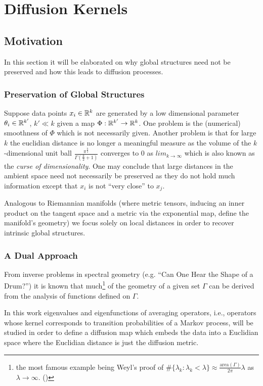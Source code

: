 \section{Diffusion Kernels}
\subsection{Motivation}
In this section it will be elaborated on why global structures need not be preserved and how this leads to diffusion processes.
\subsubsection{Preservation of Global Structures}
Suppose data points $x_i \in \mathbb{R}^k$ are generated by a low dimensional parameter $\theta_i \in \mathbb{R}^{k'}$, $k' \ll k$ given a map $\Phi: \mathbb{R}^{k'} \rightarrow \mathbb{R}^k$. One problem is the (numerical) smoothness of $\Phi$ which is not necessarily given.
Another problem is that for large $k$ the euclidian distance is no longer a meaningful measure as the volume of the $k$-dimensional unit ball $\frac{\pi^\frac{k}{2}}{\Gamma(\frac{k}{2}+1)}$ converges to $0$ as $lim_{k\rightarrow\infty}$ which is also known as the \textit{curse of dimensionality}. One may conclude that large distances in the ambient space need not necessarily be preserved as they do not hold much information except that $x_i$ is not ``very close'' to $x_j$.

Analogous to Riemannian manifolds (where metric tensors, inducing an inner product on the tangent space and a metric via the exponential map, define the manifold's geometry) we focus solely on local distances in order to recover intrinsic global structures.

\subsubsection{A Dual Approach}
From inverse problems in spectral geometry (e.g. ``Can One Hear the Shape of a Drum?'') it is known that much\footnote{the most famous example being Weyl's proof of $\#\{\lambda_k : \lambda_k < \lambda\} \approx \frac{\text{area}(\Gamma)}{2\pi}\lambda$ as $\lambda \rightarrow \infty$. (\cite{Canzani2013})} of the geometry of a given set $\Gamma$ can be derived from the analysis of functions defined on $\Gamma$.

In this work eigenvalues and eigenfunctions of averaging operators, i.e., operators whose kernel corresponds to transition probabilities of a Markov process, will be studied in order to define a diffusion map which embeds the data into a Euclidian space where the Euclidian distance is just the diffusion metric.


